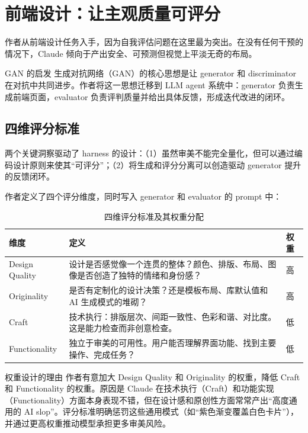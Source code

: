 \section{前端设计：让主观质量可评分}

作者从前端设计任务入手，因为自我评估问题在这里最为突出。在没有任何干预的情况下，Claude 倾向于产出安全、可预测但视觉上平淡无奇的布局。

\begin{knowledgebox}{GAN 的启发}
生成对抗网络（GAN）的核心思想是让 generator 和 discriminator 在对抗中共同进步。作者将这一思想迁移到 LLM agent 系统中：generator 负责生成前端页面，evaluator 负责评判质量并给出具体反馈，形成迭代改进的闭环。
\end{knowledgebox}

\subsection{四维评分标准}

两个关键洞察驱动了 harness 的设计：（1）虽然审美不能完全量化，但可以通过编码设计原则来使其``可评分''；（2）将生成和评分分离可以创造驱动 generator 提升的反馈闭环。

作者定义了四个评分维度，同时写入 generator 和 evaluator 的 prompt 中：

\begin{table}[H]
\centering
\begin{tabular}{lp{9cm}l}
\toprule
\textbf{维度} & \textbf{定义} & \textbf{权重} \\
\midrule
Design Quality & 设计是否感觉像一个连贯的整体？颜色、排版、布局、图像是否创造了独特的情绪和身份感？ & 高 \\
Originality & 是否有定制化的设计决策？还是模板布局、库默认值和 AI 生成模式的堆砌？ & 高 \\
Craft & 技术执行：排版层次、间距一致性、色彩和谐、对比度。这是能力检查而非创意检查。 & 低 \\
Functionality & 独立于审美的可用性。用户能否理解界面功能、找到主要操作、完成任务？ & 低 \\
\bottomrule
\end{tabular}
\caption{四维评分标准及其权重分配}
\end{table}

\begin{importantbox}{权重设计的理由}
作者有意加大 Design Quality 和 Originality 的权重，降低 Craft 和 Functionality 的权重。原因是 Claude 在技术执行（Craft）和功能实现（Functionality）方面本身表现不错，但在设计感和原创性方面常常产出``高度通用的 AI slop''。评分标准明确惩罚这些通用模式（如``紫色渐变覆盖白色卡片''），并通过更高权重推动模型承担更多审美风险。
\end{importantbox}

